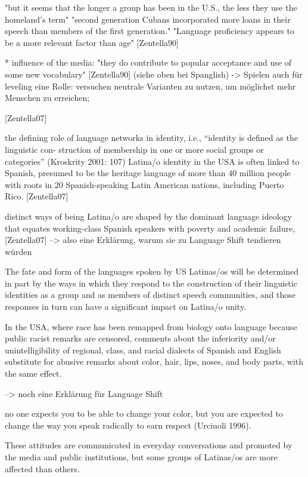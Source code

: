 "but it seems that the longer a group has been in the U.S., the less they use the homeland's term"
"second generation Cubans incorporated more loans in their speech than members of the first generation."
"Language proficiency appears to be a more relevant factor than age" [Zentella90]

* influence of the media: "they do contribute to popular acceptance and use of some new vocabulary" [Zentella90]
(siehe oben bei Spanglish)
-> Spielen auch für leveling eine Rolle: versuchen neutrale Varianten zu nutzen, um möglichst mehr Menschen zu erreichen;

[Zentella07]


the defining role of language networks in identity, i.e., “identity is defined as the linguistic con-
struction of membership in one or more social groups or categories” (Kroskrity 2001: 107)
Latina/o identity in the USA is often linked to Spanish, presumed
to be the heritage language of more than 40 million people with roots in 20
Spanish-speaking Latin American nations, including Puerto Rico.
[Zentella07]

distinct ways of being Latina/o are shaped by the dominant language ideology
that equates working-class Spanish speakers with poverty and academic failure,
[Zentella07]
--> also eine Erklärung, warum sie zu Language Shift tendieren würden

The fate and form of the languages spoken by US
Latinas/os will be determined in part by the ways in which they respond to the
construction of their linguistic identities as a group and as members of distinct
speech communities, and those responses in turn can have a significant impact
on Latina/o unity.


In
the USA, where race has been remapped from biology onto language because
public racist remarks are censored, comments about the inferiority and/or
unintelligibility of regional, class, and racial dialects of Spanish and English
substitute for abusive remarks about color, hair, lips, noses, and body parts, with
the same effect.

--> noch eine Erklärung für Language Shift

no one expects you to be able to change your color, but you are expected to
change the way you speak radically to earn respect (Urciuoli 1996).

These attitudes are communicated in everyday conversations and promoted by
the media and public institutions, but some groups of Latinas/os are more affected
than others.

